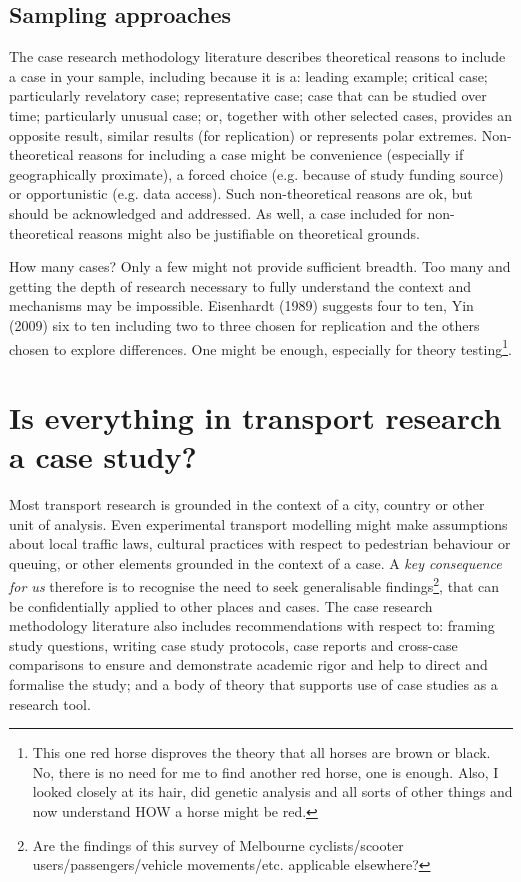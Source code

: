 \documentclass{tufte-handout}
\begin{document}
\subsection{Sampling approaches}
The case research methodology literature describes theoretical reasons to include a case in your sample, including because it is a: leading example; critical case; particularly revelatory case; representative case; case that can be studied over time; particularly unusual case; or, together with other selected cases, provides an opposite result, similar results (for replication) or represents polar extremes. Non-theoretical reasons for including a case might be convenience (especially if geographically proximate), a forced choice (e.g. because of study funding source) or opportunistic (e.g. data access)\cite{Eisenhardt1989aa, Meredith1998aa, Stuart2002aa, Voss2002aa,}. Such non-theoretical reasons are ok, but should be acknowledged and addressed.  As well, a case included for non-theoretical reasons might also be justifiable on theoretical grounds.  

How many cases?  Only a few might not provide sufficient breadth.  Too many and getting the depth of research necessary to fully understand the context and mechanisms may be impossible. Eisenhardt (1989) suggests four to ten, Yin (2009) six to ten including two to three  chosen for replication and the others chosen to explore differences. One might be enough, especially for theory testing\footnote{This one red horse disproves the theory that all horses are brown or black.  No, there is no need for me to find another red horse, one is enough. Also, I looked closely at its hair, did genetic analysis and all sorts of other things and now understand HOW a horse might be red.}.


\section{Is everything in transport research a case study?}
Most transport research is grounded in the context of a city, country or other unit of analysis. Even experimental transport modelling might make assumptions about local traffic laws, cultural practices with respect to pedestrian behaviour or queuing, or other elements grounded in the context of a case.  A \emph{key consequence for us} therefore is to recognise the need to seek generalisable findings\footnote{Are the findings of this survey of Melbourne cyclists/scooter users/passengers/vehicle movements/etc. applicable elsewhere?}, that can be confidentially applied to other places and cases.  The case research methodology literature also includes recommendations with respect to: framing study questions, writing case study protocols, case reports and cross-case comparisons to ensure and demonstrate academic rigor and help to direct and formalise the study; and a body of theory that supports use of case studies as a research tool.  



\end{document}
